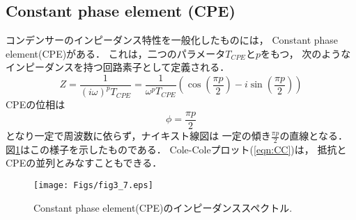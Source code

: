 \subsection{Constant phase element (CPE)}
コンデンサーのインピーダンス特性を一般化したものには，
Constant phase element(CPE)がある．
これは，二つのパラメータ$T_{CPE}$と$p$をもつ，
次のようなインピーダンスを持つ回路素子として定義される．
\begin{equation}
	Z=\frac{1}{(i\omega)^pT_{CPE}}
	=\frac{1}{\omega^p T_{CPE}} 
	\left( 
		\cos\left(\frac{\pi p}{2}\right) 
		-
		i
		\sin\left(\frac{\pi p}{2}\right) 
	\right)
	\label{eqn:Z_CPE}
\end{equation}
CPEの位相は
\begin{equation}
	\phi=\frac{\pi p}{2}
	\label{eqn:}
\end{equation}
となり一定で周波数に依らず，ナイキスト線図は
一定の傾き$\frac{\pi p}{2}$の直線となる．
図\ref{fig:fig3_7}はこの様子を示したものである．
Cole-Coleプロット(\ref{eqn:CC})は，
抵抗とCPEの並列とみなすこともできる．
\begin{figure}[h]
	\begin{center}
	\texttt{[image: Figs/fig3\_7.eps]} 
	\end{center}
	\caption{
		Constant phase element(CPE)のインピーダンススペクトル.
	} 
	\label{fig:fig3_7}
\end{figure}

